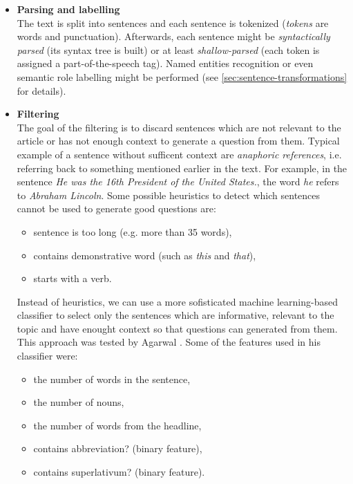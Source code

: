\documentclass[12pt, twoside]{fithesis2}		%
\renewcommand{\_}{\leavevmode \kern0.07em\vbox{\hrule width0.4em}}
\newcommand{\squarebullet}{\textcolor{black}{\raisebox{0.15em}{\rule{4pt}{4pt}}}}
\newcommand{\emptysquarebullet}{\textcolor{black}{\raisebox{0.10em}{\tiny$\square$}}}
\newenvironment{myItemize}{
  \begin{itemize}[leftmargin=2em,rightmargin=1em,itemsep=\parskip ,parsep=0em,topsep=0em,partopsep=0em]
  \renewcommand{\labelitemi}{\squarebullet}
  \renewcommand{\labelitemii}{\textbullet}
}{
  \end{itemize}
}
\begin{document}
\begin{myItemize}
  \item \textbf{Parsing and labelling}\\
    The text is split into sentences and each sentence is tokenized (\emph{tokens} are words and punctuation).
    Afterwards, each sentence might be \emph{syntactically parsed} (its syntax tree is built)
    or at least \textit{shallow-parsed} (each token is assigned a part-of-the-speech tag).
    Named entities recognition or even semantic role labelling might be performed
    (see \autoref{sec:sentence-transformations} for details).

  \item \textbf{Filtering}\\
    The goal of the filtering is to discard sentences which are not relevant to the article or has not enough context to generate a question from them.
    Typical example of a sentence without sufficent context are \emph{anaphoric references},
    i.e. referring back to something mentioned earlier in the text.
    For example, in the sentence \emph{He was the 16th President of the United States.},
    the word \emph{he} refers to \emph{Abraham Lincoln}.
  Some possible heuristics to detect which sentences cannot be used to generate good questions \cite{questions-wolfe} are:
  \begin{itemize}
  \item sentence is too long (e.g. more than 35 words),
  \item contains demonstrative word (such as \emph{this} and \emph{that}),
  \item starts with a verb.
  \end{itemize}

  Instead of heuristics, we can use a more sofisticated machine learning-based classifier to select only the sentences which are informative, relevant to the topic and have enought context so that questions can generated from them. This approach was tested by Agarwal \cite{question-gen-textbooks}.
Some of the features used in his classifier were:
  \begin{itemize}
  \item the number of words in the sentence,
  \item the number of nouns,
  \item the number of words from the headline,
  \item contains abbreviation? (binary feature),
  \item contains superlativum? (binary feature).
  \end{itemize}


\end{myItemize}
\end{document}
